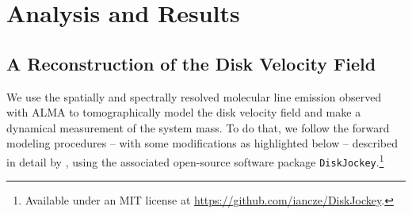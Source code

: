 \documentclass[twocolumn]{aastex61}
\begin{document}



\section{Analysis and Results}

\subsection{A Reconstruction of the Disk Velocity Field}
We use the spatially and spectrally resolved molecular line emission observed with ALMA to tomographically model the disk velocity field and make a dynamical measurement of the system mass.  To do that, we follow the forward modeling procedures -- with some modifications as highlighted below -- described in detail by \citet{czekala15a,czekala16}, using the associated open-source software package {\tt DiskJockey}.\footnote{Available under an MIT license at \url{https://github.com/iancze/DiskJockey}.}
\end{document}
